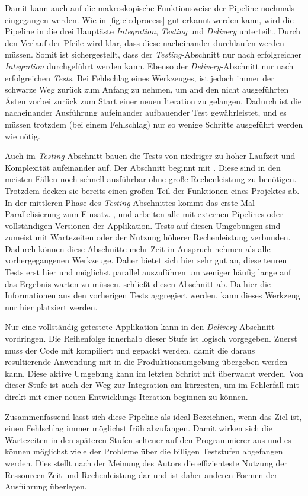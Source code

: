 Damit kann auch auf die makroskopische Funktionsweise der Pipeline nochmals eingegangen werden. Wie in \autoref{fig:cicdprocess} gut erkannt werden kann, wird die Pipeline in die drei Hauptäste \emph{Integration}, \emph{Testing} und \emph{Delivery} unterteilt. Durch den Verlauf der Pfeile wird klar, dass diese nacheinander durchlaufen werden müssen. Somit ist sichergestellt, dass der \emph{Testing}-Abschnitt nur nach erfolgreicher \emph{Integration} durchgeführt werden kann. Ebenso der \emph{Delivery}-Abschnitt nur nach erfolgreichen \emph{Tests}. Bei Fehlschlag eines Werkzeuges, ist jedoch immer der schwarze Weg zurück zum Anfang zu nehmen, um and den nicht ausgeführten Ästen vorbei zurück zum Start einer neuen Iteration zu gelangen. Dadurch ist die nacheinander Ausführung aufeinander aufbauender Test gewährleistet, und es müssen trotzdem (bei einem Fehlschlag) nur so wenige Schritte ausgeführt werden wie nötig.

Auch im \emph{Testing}-Abschnitt bauen die Tests von niedriger zu hoher Laufzeit und Komplexität aufeinander auf. Der Abschnitt beginnt mit . Diese sind in den meisten Fällen noch schnell ausführbar ohne große Rechenleistung zu benötigen. Trotzdem decken sie bereits einen großen Teil der Funktionen eines Projektes ab. 
In der mittleren Phase des \emph{Testing}-Abschnittes kommt das erste Mal Parallelisierung zum Einsatz. ,  und  arbeiten alle mit externen Pipelines oder vollständigen Versionen der Applikation. Tests auf diesen Umgebungen sind zumeist mit Wartezeiten oder der Nutzung höherer Rechenleistung verbunden. Dadurch können diese Abschnitte mehr Zeit in Anspruch nehmen als alle vorhergegangenen Werkzeuge. Daher bietet sich hier sehr gut an, diese \glqq teuren\grqq{} Tests erst hier und möglichst parallel auszuführen um weniger häufig lange auf das Ergebnis warten zu müssen.
 schließt diesen Abschnitt ab. Da hier die Informationen aus den vorherigen Tests aggregiert werden, kann dieses Werkzeug nur hier platziert werden.

Nur eine vollständig getestete Applikation kann in den \emph{Delivery}-Abschnitt vordringen. Die Reihenfolge innerhalb dieser Stufe ist logisch vorgegeben. Zuerst muss der Code mit  kompiliert und gepackt werden, damit die daraus resultierende Anwendung mit  in die Produktionsumgebung übergeben werden kann. Diese aktive Umgebung kann im letzten Schritt mit  überwacht werden. Von dieser Stufe ist auch der Weg zur Integration am kürzesten, um im Fehlerfall mit direkt mit einer neuen Entwicklungs-Iteration beginnen zu können.

Zusammenfassend lässt sich diese Pipeline als \glqq ideal\grqq{} Bezeichnen, wenn das Ziel ist, einen Fehlschlag immer möglichst früh abzufangen. Damit wirken sich die Wartezeiten in den späteren Stufen seltener auf den Programmierer aus und es können möglichst viele der Probleme über die billigen Teststufen abgefangen werden.
Dies stellt nach der Meinung des Autors die effizienteste Nutzung der Ressourcen Zeit und Rechenleistung dar und ist daher anderen Formen der Ausführung überlegen.
